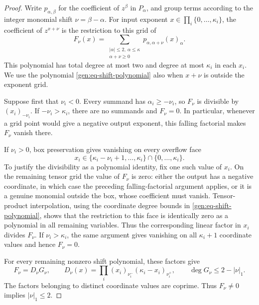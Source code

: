 \documentclass[reqno]{amsart}
\theoremstyle{definition}
\theoremstyle{remark}
\begin{document}
\begin{proof}
Write \(p_{\alpha,\beta}\) for the coefficient of \(z^\beta\) in
\(P_\alpha\), and group terms according to the integer monomial shift
\(\nu=\beta-\alpha\).  For input exponent
\(x\in\prod_i\{0,\ldots,\kappa_i\}\), the coefficient of \(z^{x+\nu}\) is
the restriction to this grid of
\begin{equation}
 F_\nu(x)=
 \sum_{\substack{|\alpha|\leq2,\ \alpha\leq\kappa\\
                  \alpha+\nu\geq0}}
 p_{\alpha,\alpha+\nu}(x)_\alpha.
 \label{gen:eq-shift-polynomial}
\end{equation}
This polynomial has total degree at most two and degree at most
\(\kappa_i\) in each \(x_i\).  We use the polynomial
\eqref{gen:eq-shift-polynomial} also when \(x+\nu\) is outside the exponent
grid.

Suppose first that \(\nu_i<0\).  Every summand has
\(\alpha_i\geq-\nu_i\), so \(F_\nu\) is divisible by
\((x_i)_{-\nu_i}\).  If \(-\nu_i>\kappa_i\), there are no summands and
\(F_\nu=0\).  In particular, whenever a grid point would give a negative
output exponent, this falling factorial makes \(F_\nu\) vanish there.

If \(\nu_i>0\), box preservation gives vanishing on every overflow face
\[
 x_i\in\{\kappa_i-\nu_i+1,\ldots,\kappa_i\}
          \cap\{0,\ldots,\kappa_i\}.
\]
To justify the divisibility as a polynomial identity, fix one such value
of \(x_i\).  On the remaining tensor grid the value of \(F_\nu\) is zero:
either the output has a negative coordinate, in which case the preceding
falling-factorial argument applies, or it is a genuine monomial outside
the box, whose coefficient must vanish.  Tensor-product interpolation,
using the coordinate degree bounds in
\eqref{gen:eq-shift-polynomial}, shows that the restriction to this face
is identically zero as a polynomial in all remaining variables.  Thus
the corresponding linear factor in \(x_i\) divides \(F_\nu\).
If \(\nu_i>\kappa_i\), the same argument gives vanishing on all
\(\kappa_i+1\) coordinate values and hence \(F_\nu=0\).

For every remaining nonzero shift polynomial, these factors give
\begin{equation}
 F_\nu=D_\nu G_\nu,\qquad
 D_\nu(x)=\prod_i(x_i)_{\nu_i^-}
                       (\kappa_i-x_i)_{\nu_i^+},
 \qquad
 \deg G_\nu\leq2-|\nu|_1.
 \label{gen:eq-shift-factor}
\end{equation}
The factors belonging to distinct coordinate values are coprime.
Thus \(F_\nu\neq0\) implies \(|\nu|_1\leq2\).


\end{proof}
\end{document}

